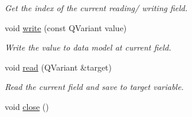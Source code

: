 \begin{DoxyCompactItemize}
\begin{DoxyCompactList}\small\item\em Get the index of the current reading/ writing field. \item\end{DoxyCompactList}\item 
void \hyperlink{classDQStream_afdec804fdfd654dff92e2f60ebe76018}{write} (const QVariant value)
\begin{DoxyCompactList}\small\item\em Write the value to data model at current field. \item\end{DoxyCompactList}\item 
\hypertarget{classDQStream_a182af12d29578dfceaf18947a3be1d01}{
void \hyperlink{classDQStream_a182af12d29578dfceaf18947a3be1d01}{read} (QVariant \&target)}
\label{classDQStream_a182af12d29578dfceaf18947a3be1d01}

\begin{DoxyCompactList}\small\item\em Read the current field and save to target variable. \item\end{DoxyCompactList}\item 
\hypertarget{classDQStream_ae20759e81d4b8f36ed622c57b96eacb7}{
void \hyperlink{classDQStream_ae20759e81d4b8f36ed622c57b96eacb7}{close} ()}
\label{classDQStream_ae20759e81d4b8f36ed622c57b96eacb7}


\end{DoxyCompactItemize}

